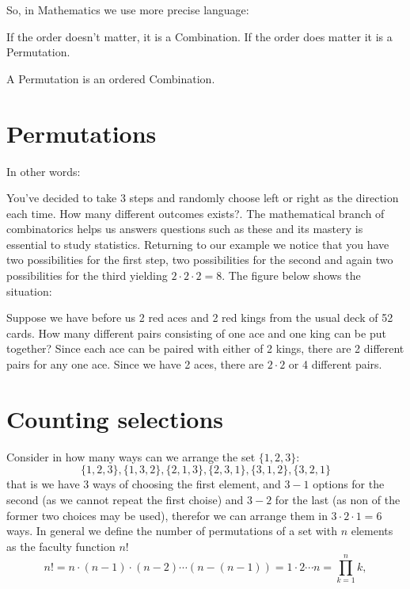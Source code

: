 So, in Mathematics we use more precise language:

	If the order doesn't matter, it is a Combination.
	If the order does matter it is a Permutation.

A Permutation is an ordered Combination.

\section{Permutations}
In other words:

You've decided to take $3$ steps and randomly choose left or right as the direction each time. How many different outcomes exists?. The mathematical branch of combinatorics helps us answers questions such as these and its mastery is essential to study statistics. Returning to our example we notice that you have two possibilities for the first step, two possibilities for the second and again two possibilities for the third yielding $2 \cdot 2 \cdot 2 = 8$. The figure below shows the situation:
\begin{figure}[H]
\centering
{}
\end{figure}

Suppose we have before us 2 red aces and 2 red kings from the usual deck of 52 cards. How many different pairs consisting of one ace and one king can be put together? Since each ace can be paired with either of 2 kings, there are 2 different pairs for any one ace. Since we have 2 aces, there are $2 \cdot 2$ or 4 different pairs.

\section{Counting selections}
Consider in how many ways can we arrange the set $\{1,2,3\}$:
\[
\{1, 2, 3\}, \{1, 3, 2\}, \{2, 1, 3\}, \{2, 3, 1\}, \{3, 1, 2\}, \{3, 2, 1\}
\]
that is we have $3$ ways of choosing the first element, and $3-1$ options for the second (as we cannot repeat the first choise) and $3-2$ for the last (as non of the former two choices may be used), therefor we can arrange them in $3 \cdot 2 \cdot 1 = 6$ ways. In general we define the number of permutations of a set with $n$ elements as the faculty function $n!$
\[
n! = n \cdot (n-1) \cdot (n-2) \cdots  (n - (n -1)) = 1 \cdot 2 \cdots n = \prod_{k=1}^{n}k,
\]

